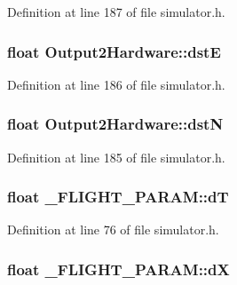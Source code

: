 \-Definition at line 187 of file simulator.\-h.

\hypertarget{group___h_i_t_l_plugin_ga5d4746c1f8dd9251dd5b37ced82d4a93}{
\subsubsection[{dst\-E}]{\setlength{\rightskip}{0pt plus 5cm}float {\bf \-Output2\-Hardware\-::dst\-E}}}\label{group___h_i_t_l_plugin_ga5d4746c1f8dd9251dd5b37ced82d4a93}


\-Definition at line 186 of file simulator.\-h.

\hypertarget{group___h_i_t_l_plugin_gad276a9a114b2d57a5c4536e9ef0a9a12}{
\subsubsection[{dst\-N}]{\setlength{\rightskip}{0pt plus 5cm}float {\bf \-Output2\-Hardware\-::dst\-N}}}\label{group___h_i_t_l_plugin_gad276a9a114b2d57a5c4536e9ef0a9a12}


\-Definition at line 185 of file simulator.\-h.

\hypertarget{group___h_i_t_l_plugin_gabba6faff155324d93353abc952708700}{
\subsubsection[{d\-T}]{\setlength{\rightskip}{0pt plus 5cm}float {\bf \-\_\-\-F\-L\-I\-G\-H\-T\-\_\-\-P\-A\-R\-A\-M\-::d\-T}}}\label{group___h_i_t_l_plugin_gabba6faff155324d93353abc952708700}


\-Definition at line 76 of file simulator.\-h.

\hypertarget{group___h_i_t_l_plugin_gaa09582d7507d6bc84817aad1828e79a6}{
\subsubsection[{d\-X}]{\setlength{\rightskip}{0pt plus 5cm}float {\bf \-\_\-\-F\-L\-I\-G\-H\-T\-\_\-\-P\-A\-R\-A\-M\-::d\-X}}}\label{group___h_i_t_l_plugin_gaa09582d7507d6bc84817aad1828e79a6}


